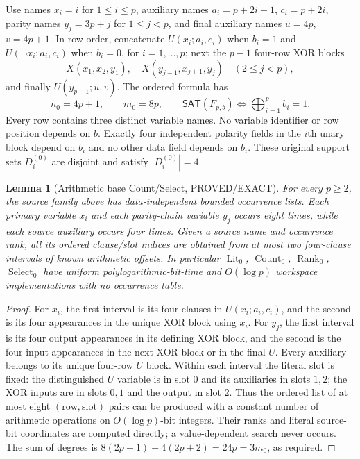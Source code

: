 \documentclass[11pt]{article}
\newtheorem{lemma}[theorem]{Lemma}
\newcommand{\SAT}{\mathsf{SAT}}
\begin{document}
Use names $x_i=i$ for $1\le i\le p$, auxiliary names $a_i=p+2i-1$, $c_i=p+2i$, parity names $y_j=3p+j$ for $1\le j<p$, and final auxiliary names $u=4p$, $v=4p+1$. In row order, concatenate $U(x_i;a_i,c_i)$ when $b_i=1$ and $U(\neg x_i;a_i,c_i)$ when $b_i=0$, for $i=1,\ldots,p$; next the $p-1$ four-row XOR blocks
\[
 X(x_1,x_2,y_1),\quad X(y_{j-1},x_{j+1},y_j)\quad(2\le j<p),
\]
and finally $U(y_{p-1};u,v)$. The ordered formula has
\[
 n_0=4p+1,\qquad m_0=8p,\qquad \SAT(F_{p,b})\iff\bigoplus_{i=1}^pb_i=1.
\tag{1}
\]
Every row contains three distinct variable names. No variable identifier or row position depends on $b$. Exactly four independent polarity fields in the $i$th unary block depend on $b_i$ and no other data field depends on $b_i$. These original support sets $D_i^{(0)}$ are disjoint and satisfy $|D_i^{(0)}|=4$.

\begin{lemma}[Arithmetic base Count/Select, PROVED/EXACT]
For every $p\ge2$, the source family above has data-independent bounded occurrence lists. Each primary variable $x_i$ and each parity-chain variable $y_j$ occurs eight times, while each source auxiliary occurs four times. Given a source name and occurrence rank, all its ordered clause/slot indices are obtained from at most two four-clause intervals of known arithmetic offsets. In particular $\operatorname{Lit}_0$, $\operatorname{Count}_0$, $\operatorname{Rank}_0$, $\operatorname{Select}_0$ have uniform polylogarithmic-bit-time and $O(\log p)$ workspace implementations with no occurrence table.
\end{lemma}
\begin{proof}
For $x_i$, the first interval is its four clauses in $U(x_i;a_i,c_i)$, and the second is its four appearances in the unique XOR block using $x_i$. For $y_j$, the first interval is its four output appearances in its defining XOR block, and the second is the four input appearances in the next XOR block or in the final $U$. Every auxiliary belongs to its unique four-row $U$ block. Within each interval the literal slot is fixed: the distinguished $U$ variable is in slot $0$ and its auxiliaries in slots $1,2$; the XOR inputs are in slots $0,1$ and the output in slot $2$. Thus the ordered list of at most eight $(\text{row},\text{slot})$ pairs can be produced with a constant number of arithmetic operations on $O(\log p)$-bit integers. Their ranks and literal source-bit coordinates are computed directly; a value-dependent search never occurs. The sum of degrees is $8(2p-1)+4(2p+2)=24p=3m_0$, as required.
\end{proof}
\end{document}
